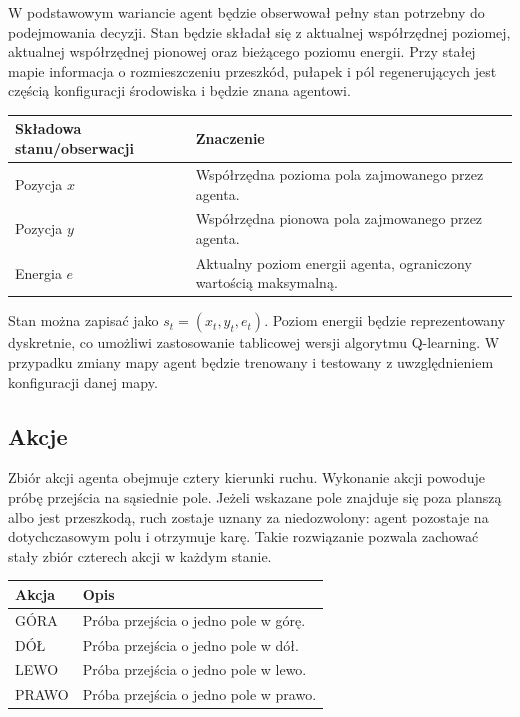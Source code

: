 \documentclass[12pt]{article}
\begin{document}
W podstawowym wariancie agent będzie obserwował pełny stan potrzebny do podejmowania decyzji. Stan będzie składał się z aktualnej współrzędnej poziomej, aktualnej współrzędnej pionowej oraz bieżącego poziomu energii. Przy stałej mapie informacja o rozmieszczeniu przeszkód, pułapek i pól regenerujących jest częścią konfiguracji środowiska i będzie znana agentowi.

\begin{center}
\begin{tabular}{p{}p{}}
\toprule
Składowa stanu/obserwacji & Znaczenie \\
\midrule
Pozycja $x$ & Współrzędna pozioma pola zajmowanego przez agenta. \\
Pozycja $y$ & Współrzędna pionowa pola zajmowanego przez agenta. \\
Energia $e$ & Aktualny poziom energii agenta, ograniczony wartością maksymalną. \\
\bottomrule
\end{tabular}
\end{center}

Stan można zapisać jako $s_t=(x_t,y_t,e_t)$. Poziom energii będzie reprezentowany dyskretnie, co umożliwi zastosowanie tablicowej wersji algorytmu Q-learning. W przypadku zmiany mapy agent będzie trenowany i testowany z uwzględnieniem konfiguracji danej mapy.

\subsection{Akcje}

Zbiór akcji agenta obejmuje cztery kierunki ruchu. Wykonanie akcji powoduje próbę przejścia na sąsiednie pole. Jeżeli wskazane pole znajduje się poza planszą albo jest przeszkodą, ruch zostaje uznany za niedozwolony: agent pozostaje na dotychczasowym polu i otrzymuje karę. Takie rozwiązanie pozwala zachować stały zbiór czterech akcji w każdym stanie.

\begin{center}
\begin{tabular}{p{}p{}}
\toprule
Akcja & Opis \\
\midrule
GÓRA & Próba przejścia o jedno pole w górę. \\
DÓŁ & Próba przejścia o jedno pole w dół. \\
LEWO & Próba przejścia o jedno pole w lewo. \\
PRAWO & Próba przejścia o jedno pole w prawo. \\
\bottomrule
\end{tabular}
\end{center}
\end{document}
